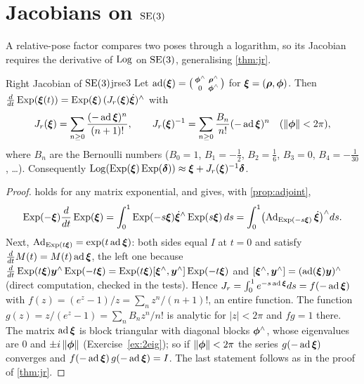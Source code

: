 \section{Jacobians on $\mathrm{SE}(3)$}

A relative-pose factor compares two poses through a logarithm, so its
Jacobian requires the derivative of $\operatorname{Log}$ on $\mathrm{SE}(3)$, generalising
\cref{thm:jr}.

\begin{theorem}{Right Jacobian of $\mathrm{SE}(3)$}{jrse3}
Let $\operatorname{ad}(\bm{\xi})=\bigl(\begin{smallmatrix}\bm{\phi}^{\wedge}&\bm{\rho}^{\wedge}\\0&
\bm{\phi}^{\wedge}\end{smallmatrix}\bigr)$ for $\bm{\xi}=(\bm{\rho},\bm{\phi})$. Then
$\frac{d}{dt}\operatorname{Exp}(\bm{\xi}(t))=\operatorname{Exp}(\bm{\xi})\,(J_r(\bm{\xi})\dot{\bm{\xi}})^{\wedge}$ with
\begin{equation}\label{eq:jrse3}
J_r(\bm{\xi})=\sum_{n\ge0}\frac{(-\operatorname{ad}\bm{\xi})^n}{(n+1)!},\qquad
J_r(\bm{\xi})^{-1}=\sum_{n\ge0}\frac{B_n}{n!}(-\operatorname{ad}\bm{\xi})^n\quad
(\left\lVert \bm{\phi}\right\rVert<2\pi),
\end{equation}
where $B_n$ are the Bernoulli numbers ($B_0=1$, $B_1=-\frac12$, $B_2=
\frac16$, $B_3=0$, $B_4=-\frac1{30}$, \dots). Consequently
$\operatorname{Log}(\operatorname{Exp}(\bm{\xi})\operatorname{Exp}(\bm{\delta}))\approx\bm{\xi}+J_r(\bm{\xi})^{-1}\bm{\delta}$.
\end{theorem}

\begin{proof}
 holds for any matrix exponential, and gives, with
\cref{prop:adjoint},
\[
\operatorname{Exp}(-\bm{\xi})\frac{d}{dt}\operatorname{Exp}(\bm{\xi})=\int_0^1\operatorname{Exp}(-s\bm{\xi})\dot{\bm{\xi}}^{\wedge}
\operatorname{Exp}(s\bm{\xi})\,ds=\int_0^1\bigl(\operatorname{Ad}_{\operatorname{Exp}(-s\bm{\xi})}\dot{\bm{\xi}}\bigr)^{\wedge}ds.
\] Next, $\operatorname{Ad}_{\operatorname{Exp}(t\bm{\xi})}=\exp(t\operatorname{ad}\bm{\xi})$: both
sides equal $I$ at $t=0$ and satisfy $\frac{d}{dt}M(t)=M(t)\operatorname{ad}\bm{\xi}$, the
left one because $\frac{d}{dt}\operatorname{Exp}(t\bm{\xi})\bm{y}^{\wedge}\operatorname{Exp}(-t\bm{\xi})=
\operatorname{Exp}(t\bm{\xi})[\bm{\xi}^{\wedge},\bm{y}^{\wedge}]\operatorname{Exp}(-t\bm{\xi})$ and
$[\bm{\xi}^{\wedge},\bm{y}^{\wedge}]=(\operatorname{ad}(\bm{\xi})\bm{y})^{\wedge}$ (direct
computation, checked in the tests). Hence $J_r=\int_0^1e^{-s\operatorname{ad}\bm{\xi}}ds=
f(-\operatorname{ad}\bm{\xi})$ with $f(z)=(e^z-1)/z=\sum_nz^n/(n+1)!$, an entire function.
The function $g(z)=z/(e^z-1)=\sum_nB_nz^n/n!$ is analytic for $|z|<2\pi$
and $fg=1$ there. The matrix $\operatorname{ad}\bm{\xi}$ is block triangular with diagonal
blocks $\bm{\phi}^{\wedge}$, whose eigenvalues are $0$ and $\pm i\left\lVert \bm{\phi}\right\rVert$
(Exercise~\ref{ex:2eig}); so if $\left\lVert \bm{\phi}\right\rVert<2\pi$ the series $g(-\operatorname{ad}
\bm{\xi})$ converges and $f(-\operatorname{ad}\bm{\xi})\,g(-\operatorname{ad}\bm{\xi})=I$. The last statement
follows as in the proof of \cref{thm:jr}.
\end{proof}

